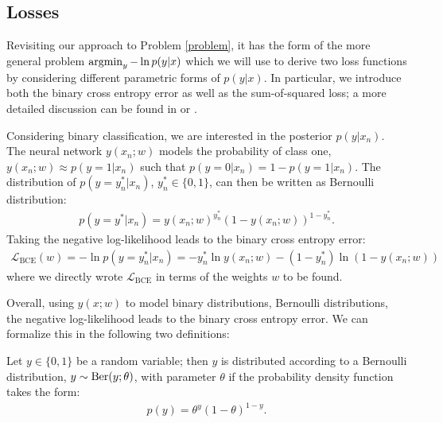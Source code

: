 \subsection{Losses}
\label{sec:deep-learning-losses}

Revisiting our approach to Problem \ref{problem}, it has the form of the more general problem
$\operatorname*{argmin}_y - \ln p(y|x)$ which we will use to derive two loss functions by considering
different parametric forms of $p(y | x)$.
In particular, we introduce both the binary cross entropy error
as well as the sum-of-squared loss; a more detailed discussion can be found in
\cite[Chapter~6]{Bishop:1995} or \cite[Section~6.2]{GoodfellowBengioCourville:2016}.

\begin{example}
  \label{ex:deep-learning-bce}
  Considering binary classification, we are interested in the posterior 
  $p(y | x_n)$. The neural network
  $y(x_n;w)$ models the probability of class one, \ie $y(x_n;w) \approx p(y = 1|x_n)$
  such that $p(y = 0 | x_n) = 1 - p(y = 1 | x_n)$. The distribution of $p(y = y_n^* | x_n)$,
  $y_n^* \in \{0,1\}$,
  can then be written as Bernoulli distribution:
  \begin{align}
    p(y = y^* | x_n) = y(x_n;w)^{y_n^*} (1 - y(x_n;w))^{1 - y_n^*}.
  \end{align}
  Taking the negative log-likelihood leads to the binary cross entropy error:
  \begin{align}
    \mathcal{L}_{\text{BCE}}(w) = -\ln p(y = y_n^* | x_n) = - y_n^* \ln y(x_n;w) - (1 - y_n^*) \ln (1 - y(x_n;w))
  \end{align}
  where we directly wrote $\mathcal{L}_{\text{BCE}}$ in terms of the weights $w$ to
  be found.
\end{example}

Overall, using $y(x; w)$ to model binary distributions, \ie Bernoulli distributions,
the negative log-likelihood leads to the binary cross entropy error.
We can formalize this in the following two definitions:

\begin{definition}
  \label{def:deep-learning-bernoulli}
  Let $y \in \{0,1\}$ be a random variable; then $y$ is distributed
  according to a Bernoulli distribution, $y \sim \mathrm{Ber}(y;\theta)$, with parameter
  $\theta$ if the
  probability density function takes the form:
  \begin{align}
    p(y) = \theta^{y} (1 - \theta)^{1 - y}.
  \end{align}
\end{definition}

